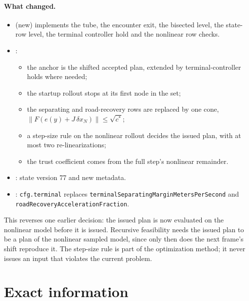 \documentclass[11pt]{article}
\begin{document}
\paragraph{What changed.}
\begin{itemize}
\item {} (new) implements the tube, the
  encounter exit, the bisected level, the state-row level, the terminal
  controller hold and the nonlinear row checks.
\item {}:
  \begin{itemize}
  \item the anchor is the shifted accepted plan, extended by
    terminal-controller holds where needed;
  \item the startup rollout stops at its first node in the set;
  \item the separating and road-recovery rows are replaced by one cone,
    $\|F(e(y)+J\,\delta x_N)\|\le\sqrt{c^*}$;
  \item a step-size rule on the nonlinear rollout decides the issued plan,
    with at most two re-linearizations;
  \item the trust coefficient comes from the full step's nonlinear
    remainder.
  \end{itemize}
\item {}: state version 77 and new
  metadata.
\item {}: \texttt{cfg.terminal}
  replaces \texttt{terminalSeparatingMarginMetersPerSecond} and
  \texttt{roadRecoveryAccelerationFraction}.
\end{itemize}
This reverses one earlier decision: the issued plan is now evaluated on the
nonlinear model before it is issued. Recursive feasibility needs the issued
plan to be a plan of the nonlinear sampled model, since only then does the
next frame's shift reproduce it. The step-size rule is part of the
optimization method; it never issues an input that violates the current
problem.

\section{Exact information}
\end{document}
